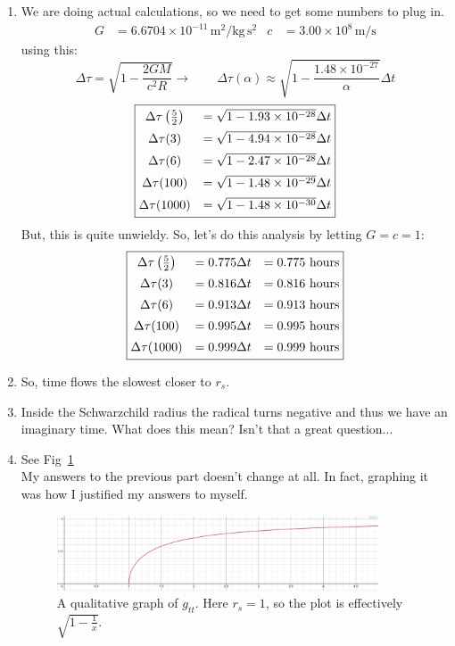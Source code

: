 \documentclass[11pt]{article}
\begin{document}
\begin{enumerate}[label=\alph*)]
\item We are doing actual calculations, so we need to get some numbers to plug in. 
\begin{align*}
G & = 6.6704\times 10^{-11} \, \text{m}^2/\text{kg} \, \text{s}^2 & c & = 3.00\times 10^{8} \, \text{m/s}
\end{align*}
using this:
\[\Delta \tau = \sqrt{1 - \frac{2GM}{c^2 R}} \longrightarrow \qquad \Delta\tau(\alpha) \approx \sqrt{1 - \frac{1.48 \times 10^{-27}}{\alpha}}\Delta t\]
\[\boxed{\mqty{ \Delta\tau\left(\frac{5}{2}\right) & = \sqrt{1 - 1.93 \times 10^{-28}}\Delta t \vspace{0.5em}\\  \Delta\tau(3) & = \sqrt{1 - 4.94 \times 10^{-28}}\Delta t \vspace{0.5em} \\ \Delta\tau(6) & = \sqrt{1 - 2.47 \times 10^{-28}} \Delta t\vspace{0.5em} \\ \Delta\tau(100) & = \sqrt{1 - 1.48 \times 10^{-29}} \Delta t\vspace{0.5em} \\ \Delta\tau(1000) & = \sqrt{1 - 1.48 \times 10^{-30}}\Delta t}}\]
But, this is quite unwieldy. So, let's do this analysis by letting $G = c = 1$:
\[\boxed{\mqty{ \Delta\tau\left(\frac{5}{2}\right) & = 0.775\Delta t & = 0.775 \text{ hours}\vspace{0.5em}\\  \Delta\tau(3) & = 0.816\Delta t & = 0.816 \text{ hours}\vspace{0.5em} \\ \Delta\tau(6) & = 0.913 \Delta t & = 0.913 \text{ hours}\vspace{0.5em} \\ \Delta\tau(100) & = 0.995 \Delta t & = 0.995 \text{ hours}\vspace{0.5em} \\ \Delta\tau(1000) & = 0.999 \Delta t & = 0.999 \text{ hours}}}\]

\item 
So, time flows the slowest closer to $r_s$.

\item 
Inside the Schwarzchild radius the radical turns negative and thus we have an imaginary time. What does this mean? Isn't that a great question...
\item See Fig~\ref{fig:1.1}\\
My answers to the previous part doesn't change at all. In fact, graphing it was how I justified my answers to myself.
\begin{figure}[!ht]
\centering
	\includegraphics[width=0.9\textwidth]{phsx491_hw05_01.png}
	\caption{A qualitative graph of $g_{tt}$. Here $r_s = 1$, so the plot is effectively $\displaystyle \sqrt{1 - \frac{1}{x}}$.}
	\label{fig:1.1}
\end{figure}
\end{enumerate}
\end{document}
